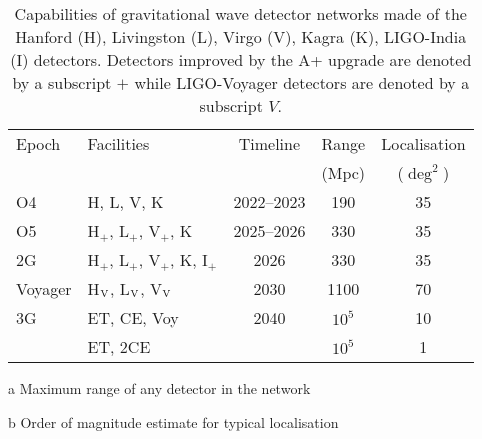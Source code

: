 \begin{table}
    \caption[Current and future gravitational wave detector network specifications]{Capabilities of gravitational wave detector networks made of the Hanford (H), Livingston (L), Virgo (V), Kagra (K), LIGO-India (I) detectors. Detectors improved by the A+ upgrade are denoted by a subscript $+$ while LIGO-Voyager detectors are denoted by a subscript $V$.}
    \label{tab:gw_facilities}
    \centering
    \begin{threeparttable}
    \begin{tabular}{llccc}
    \hline\hline
    Epoch & Facilities & Timeline & Range\tnote{a} & Localisation\tnote{b}\\
     & & & (Mpc) & ($\deg^2$)\\
    \hline
    O4 & H, L, V, K & 2022--2023 & 190 & 35 \\
    O5 & H$_{+}$, L$_{+}$, V$_{+}$, K & 2025--2026 & 330 & 35 \\
    2G & H$_{+}$, L$_{+}$, V$_{+}$, K, I$_{+}$ & 2026 & 330 & 35\\
    \rule{0pt}{3ex}Voyager & H$_{\rm V}$, L$_{\rm V}$, V$_{\rm V}$ & 2030 & 1100 & 70\\
    \rule{0pt}{3ex}3G & ET, CE, Voy & 2040 & $10^{5}$ & 10\\
    ~ & ET, 2CE & & $10^{5}$ & 1\\
    \hline\hline
    \end{tabular}
    \begin{tablenotes}\footnotesize
    \item[a] Maximum range of any detector in the network
    \item[b] Order of magnitude estimate for typical localisation
    \end{tablenotes}
    \end{threeparttable}
\end{table}